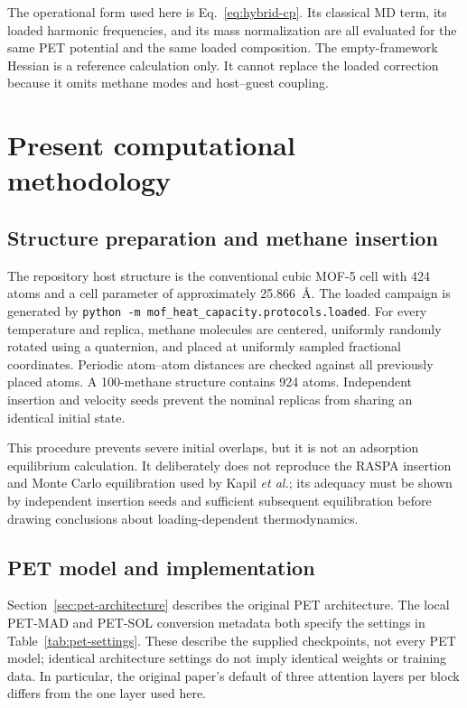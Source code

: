 \documentclass[10pt,a4paper,twocolumn]{article}
\begin{document}
The operational form used here is Eq.~\eqref{eq:hybrid-cp}. Its classical MD
term, its loaded harmonic frequencies, and its mass normalization are all
evaluated for the same PET potential and the same loaded composition. The
empty-framework Hessian is a reference calculation only. It cannot replace
the loaded correction because it omits methane modes and host--guest coupling.

\section{Present computational methodology}

\subsection{Structure preparation and methane insertion}

The repository host structure is the conventional cubic MOF-5 cell with 424
atoms and a cell parameter of approximately \SI{25.866}{\angstrom}. The loaded
campaign is generated by
\texttt{python -m mof\_heat\_capacity.protocols.loaded}. For every temperature and
replica, methane molecules are centered, uniformly randomly rotated using a
quaternion, and placed at uniformly sampled fractional coordinates. Periodic
atom--atom distances are checked against all previously placed atoms. A
100-methane structure contains 924 atoms. Independent insertion and velocity
seeds prevent the nominal replicas from sharing an identical initial state.

This procedure prevents severe initial overlaps, but it is not an adsorption
equilibrium calculation. It deliberately does not reproduce the RASPA insertion
and Monte Carlo equilibration used by Kapil \emph{et al.}; its adequacy must be
shown by independent insertion seeds and sufficient subsequent equilibration
before drawing conclusions about loading-dependent thermodynamics.

\subsection{PET model and implementation}
\label{sec:pet-implementation}

Section~\ref{sec:pet-architecture} describes the original PET architecture.
The local PET-MAD and PET-SOL conversion metadata both specify the settings
in Table~\ref{tab:pet-settings}. These describe the supplied checkpoints,
not every PET model; identical architecture settings do not imply identical
weights or training data. In particular, the original paper's default of
three attention layers per block differs from the one layer used here.
\end{document}
